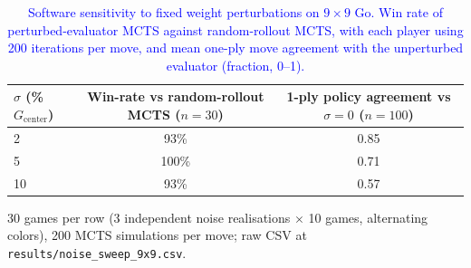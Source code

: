 \begin{table}[!htbp]
\centering
\caption{\textcolor{blue}{Software sensitivity to fixed weight perturbations on $9{\times}9$ Go. Win rate of perturbed-evaluator MCTS against random-rollout MCTS, with each player using 200 iterations per move, and mean one-ply move agreement with the unperturbed evaluator (fraction, 0--1).}}
\label{tab:supp_noise_robustness}
\footnotesize
\begin{tabular}{@{}lcc@{}}
\toprule
$\sigma$ (\% $G_{\text{center}}$) & Win-rate vs random-rollout MCTS ($n{=}30$) & 1-ply policy agreement vs $\sigma{=}0$ ($n{=}100$) \\
\midrule
2  & 93\%  & 0.85 \\
5  & 100\% & 0.71 \\
10 & 93\%  & 0.57 \\
\bottomrule
\end{tabular}
\par\vspace{0.3em}
{\scriptsize 30 games per row (3 independent noise realisations $\times$ 10 games, alternating colors), 200 MCTS simulations per move; raw CSV at \texttt{results/noise\_sweep\_9x9.csv}.}
\end{table}
